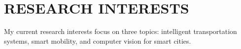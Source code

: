 \section{RESEARCH INTERESTS}
\vspace{1mm}
My current research interests focus on three topics: intelligent transportation systems, smart mobility, and computer vision for smart cities.